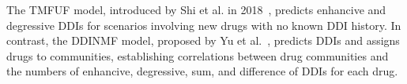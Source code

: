 \documentclass[unnumsec,webpdf,contemporary,large]{oup-authoring-template}%
\theoremstyle{thmstyleone}%
\theoremstyle{thmstyletwo}%
\theoremstyle{thmstylethree}%
\begin{document}

The TMFUF model, introduced by Shi et al. in 2018~\cite{Shi2018}, predicts enhancive and degressive DDIs for scenarios involving new drugs with no known DDI history. In contrast, the DDINMF model, proposed by Yu et al.~\cite{Yu2018}, predicts DDIs and assigns drugs to communities, establishing correlations between drug communities and the numbers of enhancive, degressive, sum, and difference of DDIs for each drug.
\end{document}
